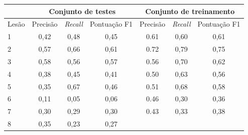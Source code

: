 \begin{table}[ht]
    \centering
    \begin{tabular}{l|c|c|c|c|c|c}
        \hline
              & \multicolumn{3}{c|}{Conjunto de testes} & \multicolumn{3}{c}{Conjunto de treinamento}
        \\ \hline
        Lesão & Precisão                                & \textit{Recall}                             & Pontuação
        F1    & Precisão                                & \textit{Recall}                             & Pontuação
        F1
        \\
        \hline
        1     & 0,42                                    & 0,48                                        & 0,45      &
        0.61  & 0,60                                    & 0,61                                                      \\
        2     & 0,57                                    & 0,66                                        & 0,61      &
        0.72  & 0,79                                    & 0,75                                                      \\
        3     & 0,58                                    & 0,56                                        & 0,57      &
        0.56  & 0,70                                    & 0,62                                                      \\
        4     & 0,38                                    & 0,45                                        & 0,41      &
        0.50  & 0,63                                    & 0,56                                                      \\
        5     & 0,35                                    & 0,67                                        & 0,46      &
        0.51  & 0,68                                    & 0,58                                                      \\
        6     & 0,11                                    & 0,05                                        & 0,06      &
        0.46  & 0,30                                    & 0,36                                                      \\
        7     & 0,30                                    & 0,29                                        & 0,30      &
        0.43  & 0,33                                    & 0,38                                                      \\
        8     & 0,35                                    & 0,23                                        & 0,27      &

\end{tabular}
\end{table}
